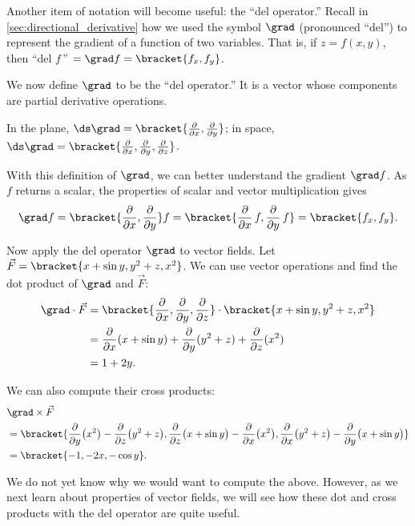 Another item of notation will become useful: the ``del operator.'' Recall in \autoref{sec:directional_derivative} how we used the symbol $\grad$ (pronounced ``del'') to represent the gradient of a function of two variables. That is, if $z = f(x,y)$, then ``del $f$\,'' $= \grad f =\bracket{f_x, f_y}$. 

We now define $\grad$ to be the ``del operator.'' It is a vector whose components are partial derivative operations. 

In the plane, $\ds\grad =\bracket{\frac{\partial}{\partial x}, \frac{\partial}{\partial y}}$; in space, $\ds\grad =\bracket{\frac{\partial}{\partial x}, \frac{\partial}{\partial y},\frac{\partial}{\partial z}}$. 

With this definition of $\grad$, we can better understand the gradient $\grad f$. As $f$ returns a scalar, the properties of scalar and vector multiplication gives
\[
\grad f
=\bracket{\frac{\partial}{\partial x}, \frac{\partial}{\partial y}}f
=\bracket{\frac{\partial}{\partial x}\,f, \frac{\partial}{\partial y}\,f}
=\bracket{f_x, f_y}.
\]

Now apply the del operator $\grad$ to vector fields. Let $\vec F =\bracket{x+\sin y,y^2+z,x^2}$. We can use vector operations and find the dot product of $\grad$ and $\vec F$:
\begin{align*}
	\grad \cdot \vec F
	&=\bracket{\frac{\partial}{\partial x}, \frac{\partial}{\partial y},\frac{\partial}{\partial z}}\cdot \bracket{x+\sin y,y^2+z,x^2}\\
	&= \frac{\partial}{\partial x}(x+\sin y)+ \frac{\partial}{\partial y}(y^2+z) + \frac{\partial}{\partial z}(x^2) \\
	&=1+2y.
\end{align*}

We can also compute their cross products:\small
\begin{align*}
	&\grad\times \vec F\\
	&= {\bracket{\frac{\partial}{\partial y}\bigl(x^2\bigr)-\frac{\partial}{\partial z}\bigl(y^2+z\bigr),\frac{\partial}{\partial z}\bigl(x+\sin y\bigr)-\frac{\partial}{\partial x}\bigl(x^2\bigr),\frac{\partial}{\partial x}\bigl(y^2+z\bigr)-\frac{\partial}{\partial y}\bigl(x+\sin y\bigr)}}\\
	&=\bracket{-1,-2x,-\cos y}.
\end{align*}\normalsize

We do not yet know why we would want to compute the above. However, as we next learn about properties of vector fields, we will see how these dot and cross products with the del operator are quite useful.

